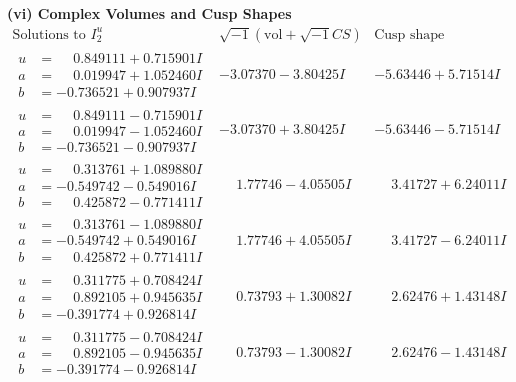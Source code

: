 \documentclass[1p]{elsarticle_modified}
\theoremstyle{definition}
\newcommand{\I}{\sqrt{-1}}
\begin{document}
\newpage\flushleft \textbf{(vi) Complex Volumes and Cusp Shapes}
$$\begin{array}{c|c|c}  
\text{Solutions to }I^u_{2}& \I (\text{vol} + \sqrt{-1}CS) & \text{Cusp shape}\\
 \hline 
\begin{aligned}
u &= \phantom{-}0.849111 + 0.715901 I \\
a &= \phantom{-}0.019947 + 1.052460 I \\
b &= -0.736521 + 0.907937 I\end{aligned}
 & -3.07370 - 3.80425 I & -5.63446 + 5.71514 I \\ \hline\begin{aligned}
u &= \phantom{-}0.849111 - 0.715901 I \\
a &= \phantom{-}0.019947 - 1.052460 I \\
b &= -0.736521 - 0.907937 I\end{aligned}
 & -3.07370 + 3.80425 I & -5.63446 - 5.71514 I \\ \hline\begin{aligned}
u &= \phantom{-}0.313761 + 1.089880 I \\
a &= -0.549742 - 0.549016 I \\
b &= \phantom{-}0.425872 - 0.771411 I\end{aligned}
 & \phantom{-}1.77746 - 4.05505 I & \phantom{-}3.41727 + 6.24011 I \\ \hline\begin{aligned}
u &= \phantom{-}0.313761 - 1.089880 I \\
a &= -0.549742 + 0.549016 I \\
b &= \phantom{-}0.425872 + 0.771411 I\end{aligned}
 & \phantom{-}1.77746 + 4.05505 I & \phantom{-}3.41727 - 6.24011 I \\ \hline\begin{aligned}
u &= \phantom{-}0.311775 + 0.708424 I \\
a &= \phantom{-}0.892105 + 0.945635 I \\
b &= -0.391774 + 0.926814 I\end{aligned}
 & \phantom{-}0.73793 + 1.30082 I & \phantom{-}2.62476 + 1.43148 I \\ \hline\begin{aligned}
u &= \phantom{-}0.311775 - 0.708424 I \\
a &= \phantom{-}0.892105 - 0.945635 I \\
b &= -0.391774 - 0.926814 I\end{aligned}
 & \phantom{-}0.73793 - 1.30082 I & \phantom{-}2.62476 - 1.43148 I \\ \hline\begin{aligned}

\end{aligned}
\end{array}$$
\end{document}
